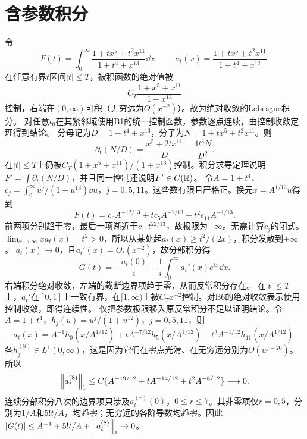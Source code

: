 \section{含参数积分}
令
\[F(t)=\int_0^\infty\frac{1+tx^5+t^2x^{11}}{1+t^4+x^{13}}\dd x,\qquad a_t(x)=\frac{1+tx^5+t^2x^{11}}{1+t^4+x^{12}}.\]
在任意有界$t$区间$|t|\le T$，被积函数的绝对值被
\[C_T\frac{1+x^5+x^{11}}{1+x^{13}}\]
控制，右端在$(0,\infty)$可积（无穷远为$O(x^{-2})$）。故为绝对收敛的Lebesgue积分。
对任意$t_0$在其紧邻域使用B1的统一控制函数，参数逐点连续，由控制收敛定理得到结论。
分母记为$D=1+t^4+x^{13}$，分子为$N=1+tx^5+t^2x^{11}$。则
\[\partial_t(N/D)=\frac{x^5+2tx^{11}}D-\frac{4t^3N}{D^2}.\]
在$|t|\le T$上仍被$C_T(1+x^5+x^{11})/(1+x^{13})$控制。积分求导定理说明$F' =\int\partial_t(N/D)$，并且同一控制还说明$F'\in C(\mathbb R)$。
令$A=1+t^4$、$c_j=\int_0^\infty u^j/(1+u^{13})\dd u$，$j=0,5,11$。这些数有限且严格正。换元$x=A^{1/13}u$得到
\[F(t)=c_0A^{-12/13}+tc_5A^{-7/13}+t^2c_{11}A^{-1/13}.\]
前两项分别趋于零，最后一项渐近于$c_{11}t^{22/13}$，故极限为$+\infty$。无需计算$c_j$的闭式。
$\lim_{x\to\infty}xa_t(x)=t^2>0$，所以从某处起$a_t(x)\ge t^2/(2x)$，积分发散到$+\infty$。
$a_t(x)\to0$，且$a_t'(x)=O_t(x^{-2})$，故分部积分得
\[G(t)=-\frac{a_t(0)}i-\frac1i\int_0^\infty a_t'(x)e^{ix}\dd x.\]
右端积分绝对收敛，左端的截断边界项趋于零，从而反常积分存在。
在$|t|\le T$上，$a_t'$在$[0,1]$上一致有界，在$[1,\infty)$上被$C_Tx^{-2}$控制。对B6的绝对收敛表示使用控制收敛，即得连续性。
仅把参数极限移入原反常积分不足以证明结论。令$A=1+t^4$，$h_j(u)=u^j/(1+u^{12})$，$j=0,5,11$，则
\[a_t(x)=A^{-1}h_0(x/A^{1/12})+tA^{-7/12}h_5(x/A^{1/12})+t^2A^{-1/12}h_{11}(x/A^{1/12}).\]
各$h_j^{(8)}\in L^1(0,\infty)$，这是因为它们在零点光滑、在无穷远分别为$O(u^{j-20})$。所以
\[\left\lVert a_t^{(8)}\right\rVert_1\le C\{A^{-19/12}+tA^{-14/12}+t^2A^{-8/12}\}\longrightarrow0.\]
连续分部积分八次的边界项只涉及$a_t^{(r)}(0)$，$0\le r\le7$。其非零项仅$r=0,5$，分别为$1/A$和$5!t/A$，均趋零；无穷远的各阶导数均趋零。因此$|G(t)|\le A^{-1}+5!t/A+\left\lVert a_t^{(8)}\right\rVert_1\to0$。
